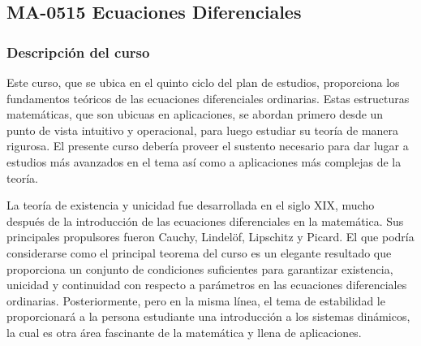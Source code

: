 \newpage
\subsection*{MA-0515 Ecuaciones Diferenciales}

\hypertarget{MA0515}{}
\begin{refsection}


\begin{table}[H]
\end{table} 


\subsubsection*{Descripción del curso}

Este curso, que se ubica en el quinto ciclo del plan de estudios, proporciona los fundamentos teóricos de las ecuaciones diferenciales ordinarias. Estas estructuras matemáticas, que son ubicuas en aplicaciones, se abordan primero desde un punto de vista intuitivo y operacional, para luego estudiar su teoría de manera rigurosa. El presente curso debería proveer el sustento necesario para dar lugar a estudios más avanzados en el tema así como a aplicaciones más complejas de la teoría. 

La teoría de existencia y unicidad fue desarrollada en el siglo XIX, mucho después de la introducción de las ecuaciones diferenciales en la matemática. Sus principales propulsores fueron Cauchy, Lindelöf, Lipschitz y Picard. El que podría considerarse como el principal teorema del curso es un elegante resultado que proporciona un conjunto de condiciones suficientes para garantizar existencia, unicidad y continuidad con respecto a parámetros en las ecuaciones diferenciales ordinarias. Posteriormente, pero en la misma línea, el tema de estabilidad le proporcionará a la persona estudiante una introducción a los sistemas dinámicos, la cual es otra área fascinante de la matemática y llena de aplicaciones.


\end{refsection}
